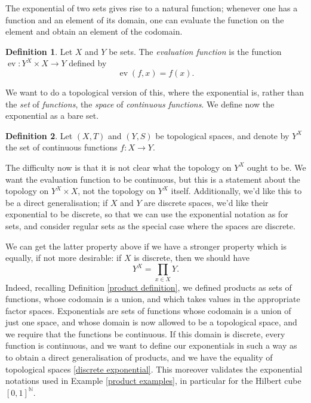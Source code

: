 \documentclass{book}
\theoremstyle{definition}
\newtheorem{definition}{Definition}[section]
\theoremstyle{remark}
\newcommand{\N}{\mathbb{N}}
\DeclareMathOperator{\ev}{ev}
\begin{document}
The exponential of two sets gives rise to a natural function; whenever one has a function and an element of its domain, one can evaluate the function on the element and obtain an element of the codomain.

\begin{definition}
    Let $X$ and $Y$ be sets. The \textit{evaluation function} is the function $\ev:Y^X\times X\to Y$ defined by 
        $$\ev(f, x)=f(x).$$
\end{definition}

We want to do a topological version of this, where the exponential is, rather than the \textit{set} of \textit{functions}, the \textit{space} of \textit{continuous functions}. We define now the exponential as a bare set.

\begin{definition}
    Let $(X, T)$ and $(Y, S)$ be topological spaces, and denote by $Y^X$ the set of continuous functions $f:X\to Y$.
\end{definition}

The difficulty now is that it is not clear what the topology on $Y^X$ ought to be. We want the evaluation function to be continuous, but this is a statement about the topology on $Y^X\times X$, not the topology on $Y^X$ itself. Additionally, we'd like this to be a direct generalisation; if $X$ and $Y$ are discrete spaces, we'd like their exponential to be discrete, so that we can use the exponential notation as for sets, and consider regular sets as the special case where the spaces are discrete.

We can get the latter property above if we have a stronger property which is equally, if not more desirable: if $X$ is discrete, then we should have
\begin{equation}\label{discrete exponential}
    Y^X=\prod_{x\in X} Y.
\end{equation}
Indeed, recalling Definition \ref{product definition}, we defined products as sets of functions, whose codomain is a union, and which takes values in the appropriate factor spaces. Exponentials are sets of functions whose codomain is a union of just one space, and whose domain is now allowed to be a topological space, and we require that the functions be continuous. If this domain is discrete, every function is continuous, and we want to define our exponentials in such a way as to obtain a direct generalisation of products, and we have the equality of topological spaces \eqref{discrete exponential}. This moreover validates the exponential notations used in Example \ref{product examples}, in particular for the Hilbert cube $[0,1]^\N$.
\end{document}
